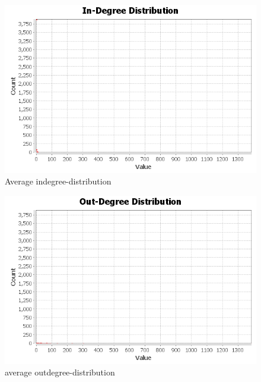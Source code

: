 \documentclass[12pt]{article}
\begin{document}
\begin{figure}[!ht]
\includegraphics[scale=0.7]{../Q3/average/indegree-distribution}
\centering
\caption{Average indegree-distribution}
\end{figure}
\newpage
\begin{figure}[!ht]
\includegraphics[scale=0.7]{../Q3/average/outdegree-distribution}
\centering
\caption{average outdegree-distribution}
\end{figure}
\newpage
\end{document}
